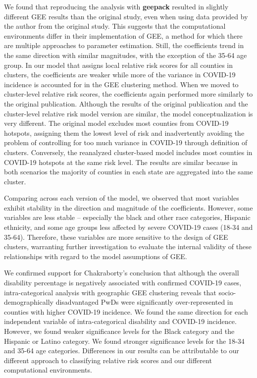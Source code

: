 \documentclass[
]{article}
\begin{document}
We found that reproducing the analysis with \textbf{geepack} resulted in
slightly different GEE results than the original study, even when using
data provided by the author from the original study. This suggests that
the computational environments differ in their implementation of GEE, a
method for which there are multiple approaches to parameter estimation.
Still, the coefficients trend in the same direction with similar
magnitudes, with the exception of the 35-64 age group. In our model that
assigns local relative risk scores for all counties in clusters, the
coefficients are weaker while more of the variance in COVID-19 incidence
is accounted for in the GEE clustering method. When we moved to
cluster-level relative risk scores, the coefficients again performed
more similarly to the original publication. Although the results of the
original publication and the cluster-level relative risk model version
are similar, the model conceptualization is very different. The original
model excludes most counties from COVID-19 hotspots, assigning them the
lowest level of risk and inadvertently avoiding the problem of
controlling for too much variance in COVID-19 through definition of
clusters. Conversely, the reanalyzed cluster-based model includes most
counties in COVID-19 hotspots at the same risk level. The results are
similar because in both scenarios the majority of counties in each state
are aggregated into the same cluster.

Comparing across each version of the model, we observed that most
variables exhibit stability in the direction and magnitude of the
coefficients. However, some variables are less stable -- especially the
black and other race categories, Hispanic ethnicity, and some age groups
less affected by severe COVID-19 cases (18-34 and 35-64). Therefore,
these variables are more sensitive to the design of GEE clusters,
warranting further investigation to evaluate the internal validity of
these relationships with regard to the model assumptions of GEE.

We confirmed support for Chakraborty's conclusion that although the
overall disability percentage is negatively associated with confirmed
COVID-19 cases, intra-categorical analysis with geographic GEE
clustering reveals that socio-demographically disadvantaged PwDs were
significantly over-represented in counties with higher COVID-19
incidence. We found the same direction for each independent variable of
intra-categorical disability and COVID-19 incidence. However, we found
weaker significance levels for the Black category and the Hispanic or
Latino category. We found stronger significance levels for the 18-34 and
35-64 age categories. Differences in our results can be attributable to
our different approach to classifying relative risk scores and our
different computational environments.
\end{document}
